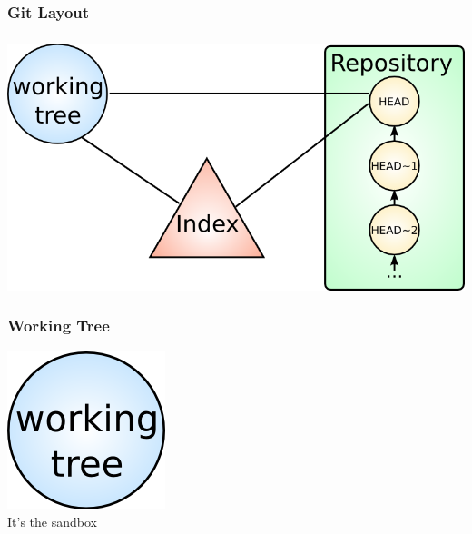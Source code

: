 
\subsubsection{Git Layout}

\begin{frame}[plain]
  \frametitle{\insertsubsection}

  \begin{center}
    \includegraphics[width=1.0\textwidth]{images/git-layout.png}
  \end{center}
\end{frame}


\subsubsection{Working Tree}


\begin{frame}

  \begin{center}
    \includegraphics[width=.25\textwidth]{images/git-working-tree.png}\\\vspacing
    \Large{It's the sandbox}
  \end{center}
\end{frame}


